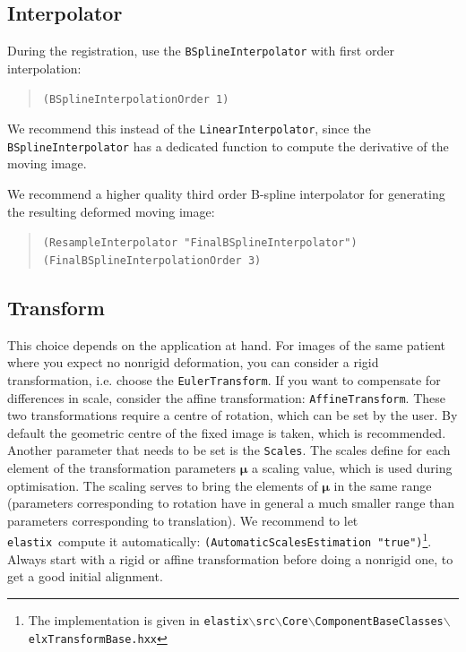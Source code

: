 \documentclass[]{report}
\newcommand{\elastix}{\texttt{elastix}}
\newcommand{\vmu}{\bm{\mu}}
\begin{document}
\subsection{Interpolator}\label{sec:interpolatortuning}

During the registration, use the \texttt{BSplineInterpolator} with
first order interpolation:
\begin{quote}
\texttt{(BSplineInterpolationOrder 1)}
\end{quote}
We recommend this instead of the \texttt{LinearInterpolator},
since the \texttt{BSplineInterpolator} has a dedicated function to
compute the derivative of the moving image.

We recommend a higher quality third order B-spline interpolator for
generating the resulting deformed moving image:
\begin{quote}
\texttt{(ResampleInterpolator "FinalBSplineInterpolator")} \\
\texttt{(FinalBSplineInterpolationOrder 3)}
\end{quote}

\subsection{Transform}\label{sec:transformtuning}

This choice depends on the application at hand. For images of the
same patient where you expect no nonrigid deformation, you can
consider a rigid transformation, i.e. choose the
\texttt{EulerTransform}. If you want to compensate for differences
in scale, consider the affine transformation:
\texttt{AffineTransform}. These two transformations require a centre
of rotation, which can be set by the user. By default the geometric
centre of the fixed image is taken, which is recommended. Another
parameter that needs to be set is the \texttt{Scales}. The scales
define for each element of the transformation parameters $\vmu$ a
scaling value, which is used during optimisation. The scaling serves
to bring the elements of $\vmu$ in the same range (parameters
corresponding to rotation have in general a much smaller range than
parameters corresponding to translation). We recommend to let
\elastix\ compute it automatically:
\texttt{(AutomaticScalesEstimation "true")}\footnote{The
implementation is given in
\texttt{elastix$\backslash$src$\backslash$Core$\backslash$ComponentBaseClasses$\backslash$elxTransformBase.hxx}}.
Always start with a rigid or affine transformation before doing a
nonrigid one, to get a good initial alignment.
\end{document}
